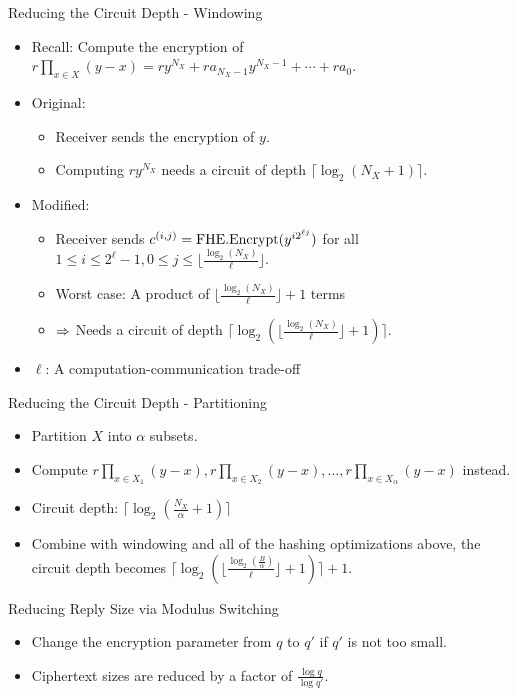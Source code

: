 \begin{frame}{Reducing the Circuit Depth - Windowing}
\begin{itemize}
\item Recall: Compute the encryption of $r\prod_{x\in X}(y-x)=ry^{N_X}+ra_{N_X-1}y^{N_X-1}+\cdots+ra_0$.
\item Original:
\begin{itemize}
\item Receiver sends the encryption of $y$.
\item Computing $ry^{N_X}$ needs a circuit of depth $\lceil\log_2(N_X+1)\rceil$.
\end{itemize}
\item Modified:
\begin{itemize}
\item Receiver sends $c^{(i, j)}=\mathrm{FHE.Encrypt}(y^{i2^{\ell j}})$ for all $1\leq i\leq2^\ell-1, 0\leq j\leq\lfloor\frac{\log_2(N_X)}\ell\rfloor$.
\item Worst case: A product of $\lfloor\frac{\log_2(N_X)}\ell\rfloor+1$ terms
\item $\Rightarrow$ Needs a circuit of depth $\lceil\log_2(\lfloor\frac{\log_2(N_X)}\ell\rfloor+1)\rceil$.
\end{itemize}
\item $\ell$: A computation-communication trade-off
\end{itemize}
\end{frame}

\begin{frame}{Reducing the Circuit Depth - Partitioning}
\begin{itemize}
\item Partition $X$ into $\alpha$ subsets.
\item Compute $r\prod_{x\in X_1}(y-x), r\prod_{x\in X_2}(y-x), \dots, r\prod_{x\in X_\alpha}(y-x)$ instead.
\item Circuit depth: $\lceil\log_2(\frac{N_X}\alpha+1)\rceil$
\item Combine with windowing and all of the hashing optimizations above, the circuit depth becomes $\lceil\log_2(\lfloor\frac{\log_2(\frac B\alpha)}\ell\rfloor+1)\rceil+1$.
\end{itemize}
\end{frame}

\begin{frame}{Reducing Reply Size via Modulus Switching}
\begin{itemize}
\item Change the encryption parameter from $q$ to $q'$ if $q'$ is not too small.
\item Ciphertext sizes are reduced by a factor of $\frac{\log q}{\log q'}$.
\end{itemize}
\end{frame}

